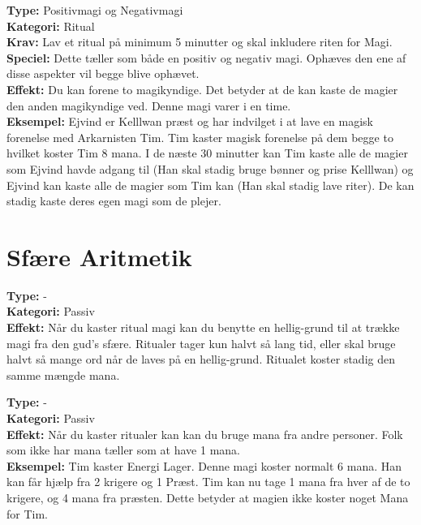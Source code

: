 \begin{mesterMagi*}
\textbf{Type:} Positivmagi og Negativmagi \\
\textbf{Kategori:} Ritual\\
\textbf{Krav:} Lav et ritual på minimum 5 minutter og skal inkludere riten for Magi.
\textbf{Speciel:} Dette tæller som både en positiv og negativ magi. Ophæves den ene af disse aspekter vil begge blive ophævet.\\
\textbf{Effekt:} Du kan forene to magikyndige. Det betyder at de kan kaste de magier den anden magikyndige ved. Denne magi varer i en time.\\
\textbf{Eksempel:} Ejvind er Kelllwan præst og har indvilget i at lave en magisk forenelse med Arkarnisten Tim. Tim kaster magisk forenelse på dem begge to hvilket koster Tim 8 mana. I de næste 30 minutter kan Tim kaste alle de magier som Ejvind havde adgang til (Han skal stadig bruge bønner og prise Kelllwan) og Ejvind kan kaste alle de magier som Tim kan (Han skal stadig lave riter). De kan stadig kaste deres egen magi som de plejer.
\end{mesterMagi*}

\section*{Sfære Aritmetik}
\begin{sAritMagi*}
\textbf{Type:} - \\
\textbf{Kategori:} Passiv\\ 
\textbf{Effekt:} Når du kaster ritual magi kan du benytte en hellig-grund til at trække magi fra den gud’s sfære. Ritualer tager kun halvt så lang tid, eller skal bruge halvt så mange ord når de laves på en hellig-grund. Ritualet koster stadig den samme mængde mana.
\end{sAritMagi*}

\begin{sAritMagi*}
\textbf{Type:} -\\
\textbf{Kategori:} Passiv\\
\textbf{Effekt:} Når du kaster ritualer kan kan du bruge mana fra andre personer. Folk som ikke har mana tæller som at have 1 mana.\\
\textbf{Eksempel:} Tim kaster Energi Lager. Denne magi koster normalt 6 mana. Han kan får hjælp fra 2 krigere og 1 Præst. Tim kan nu tage 1 mana fra hver af de to krigere, og 4 mana fra præsten. Dette betyder at magien ikke koster noget Mana for Tim.
\end{sAritMagi*}

